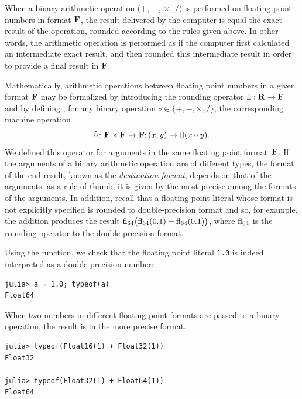 When a binary arithmetic operation ($+$, $-$, $\times$, $/$) is performed on floating point numbers in format $\mathbf F$,
the result delivered by the computer is equal the exact result of the operation,
rounded according to the rules given above.
In other words,
the arithmetic operation is performed as if the computer first calculated an intermediate exact result,
and then rounded this intermediate result in order to provide a final result in $\mathbf F$.

Mathematically,
arithmetic operations between floating point numbers in a given format $\mathbf F$ may be formalized by introducing
the rounding operator ${\rm fl}: \mathbf R \to \mathbf F$ and
by defining , for any binary operation $\circ \in \{+, -, \times, /\}$,
the corresponding machine operation
\[
    \widehat \circ\colon \mathbf F \times \mathbf F \rightarrow \mathbf F; (x, y) \mapsto {\rm fl}(x \circ y).
\]
We defined this operator for arguments in the same floating point format~$\mathbf F$.
If the arguments of a binary arithmetic operation are of different types,
the format of the end result,
known as the \emph{destination format},
depends on that of the arguments:
as a rule of thumb,
it is given by the most precise among the formats of the arguments.
In addition, recall that a floating point literal whose format is not explicitly specified is rounded to double-precision format
and so, for example, the addition  produces the result ${\rm fl_{64}}\bigl(\rm fl_{64}(0.1) + \rm fl_{64}(0.1)\bigr)$,
where ${\rm fl}_{64}$ is the rounding operator to the double-precision format.

\begin{example}
    Using the  function,
    we check that the floating point literal \texttt{1.0} is indeed interpreted as a double-precision number:
\begin{verbatim}
julia> a = 1.0; typeof(a)
Float64
\end{verbatim}

When two numbers in different floating point formats are passed to a binary operation,
the result is in the more precise format.
\begin{verbatim}
julia> typeof(Float16(1) + Float32(1))
Float32

julia> typeof(Float32(1) + Float64(1))
Float64
\end{verbatim}
\end{example}


